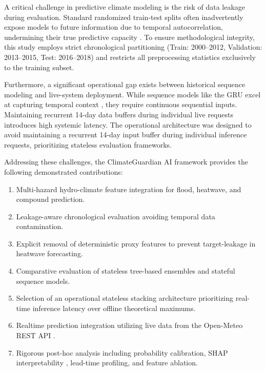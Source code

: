 A critical challenge in predictive climate modeling is the risk of data leakage during evaluation. Standard randomized train-test splits often inadvertently expose models to future information due to temporal autocorrelation, undermining their true predictive capacity \cite{Kaufman2012}. To ensure methodological integrity, this study employs strict chronological partitioning (Train: 2000--2012, Validation: 2013--2015, Test: 2016--2018) and restricts all preprocessing statistics exclusively to the training subset.

Furthermore, a significant operational gap exists between historical sequence modeling and live-system deployment. While sequence models like the GRU excel at capturing temporal context \cite{Kratzert2018}, they require continuous sequential inputs. Maintaining recurrent 14-day data buffers during individual live requests introduces high systemic latency. The operational architecture was designed to avoid maintaining a recurrent 14-day input buffer during individual inference requests, prioritizing stateless evaluation frameworks.

Addressing these challenges, the ClimateGuardian AI framework provides the following demonstrated contributions:
\begin{enumerate}
    \item Multi-hazard hydro-climate feature integration for flood, heatwave, and compound prediction.
    \item Leakage-aware chronological evaluation avoiding temporal data contamination.
    \item Explicit removal of deterministic proxy features to prevent target-leakage in heatwave forecasting.
    \item Comparative evaluation of stateless tree-based ensembles and stateful sequence models.
    \item Selection of an operational stateless stacking architecture \cite{Wolpert1992} prioritizing real-time inference latency over offline theoretical maximums.
    \item Realtime prediction integration utilizing live data from the Open-Meteo REST API \cite{OpenMeteo2023}.
    \item Rigorous post-hoc analysis including probability calibration, SHAP interpretability \cite{Lundberg2017}, lead-time profiling, and feature ablation.
\end{enumerate}
